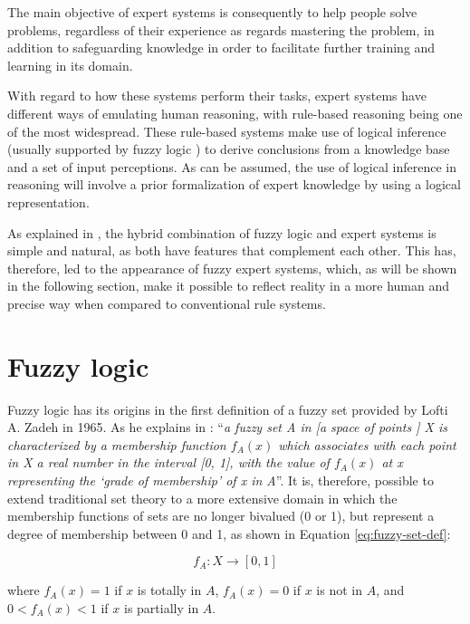The main objective of expert systems is consequently to help people solve problems, regardless of their experience as regards mastering the problem, in addition to safeguarding knowledge in order to facilitate further training and learning in its domain.

With regard to how these systems perform their tasks, expert systems have different ways of emulating human reasoning, with rule-based reasoning being one of the most widespread. These rule-based systems make use of logical inference (usually supported by fuzzy logic \cite{negoita_expert_1985, kandel_fuzzy_1991}) to derive conclusions from a knowledge base and a set of input perceptions. As can be assumed, the use of logical inference in reasoning will involve a prior formalization of expert knowledge by using a logical representation.

As explained in \cite{medsker_fuzzy_1995}, the hybrid combination of fuzzy logic and expert systems is simple and natural, as both have features that complement each other. This has, therefore, led to the appearance of fuzzy expert systems, which, as will be shown in the following section, make it possible to reflect reality in a more human and precise way when compared to conventional rule systems.

\section{Fuzzy logic}

Fuzzy logic has its origins in the first definition of a fuzzy set provided by Lofti A. Zadeh in 1965. As he explains in \cite[p.~339]{zadeh_fuzzy_1965}: “\emph{a fuzzy set A in [a space of points ] X is characterized by a membership function $f_A(x)$ which associates with each point in X a real number in the interval [0, 1], with the value of $f_A(x)$ at x representing the ‘grade of membership’ of x in A}”. It is, therefore, possible to extend traditional set theory to a more extensive domain in which the membership functions of sets are no longer bivalued (0 or 1), but represent a degree of membership between 0 and 1, as shown in Equation \ref{eq:fuzzy-set-def}:

\begin{equation}
\label{eq:fuzzy-set-def}
f_A: X \rightarrow [0,1]
\end{equation}

where $f_A (x) = 1$ if $x$ is totally in $A$, $f_A (x) = 0$ if $x$ is not in $A$, and $0<f_A (x)<1$ if $x$ is partially in $A$.

